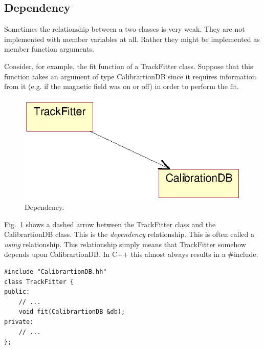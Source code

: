 \begin{Entry}
\begin{Entry}
\subsection{Dependency}

Sometimes the relationship between a two classes is very weak. They
are not implemented with member variables at all. Rather they might be
implemented as member function arguments.

Consider, for example, the fit function of a TrackFitter class.
Suppose that this function takes an argument of type CalibrartionDB
since it requires information from it (e.g. if the magnetic field was
on or off) in order to perform the fit.
\begin{figure}[htb]
    \begin{center}
        \includegraphics{umlDependency.eps}
        \caption{Dependency.}
        \label{fig:umlDependency}
    \end{center}
\end{figure}
Fig.~\ref{fig:umlDependency} shows a dashed arrow between the
TrackFitter class and the CalibrartionDB class. This is the
\emph{dependency} relationship. This is often called a \emph{using}
relationship.  This relationship simply means that TrackFitter somehow
depends upon CalibrartionDB. In C++ this almost always results in a
\#include:

{\footnotesize
\begin{verbatim}
#include "CalibrartionDB.hh"
class TrackFitter {
public:
    // ...
    void fit(CalibrartionDB &db);
private:
    // ...
};
\end{verbatim}
}%

%
%

\printindex


\bye


\end{Entry}
\end{Entry}
